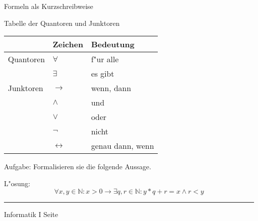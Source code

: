 
\begin{slide}{}
\normalsize
\begin{center}
Formeln als Kurzschreibweise
\end{center}
\vspace{0.5cm}

\footnotesize
\begin{center}
Tabelle der Quantoren und Junktoren

\begin{tabular}[c]{|l|l|l|}
\hline
            & Zeichen    &  Bedeutung  \\
\hline
\cline{2-3}  Quantoren   & $\forall$ & f"ur alle \\
\cline{2-3}              & $\exists$ & es  gibt \\
\hline
\cline{2-3} Junktoren    & $\rightarrow$ & wenn, dann \\
\cline{2-3}              & $\wedge$  & und \\
\cline{2-3}              & $\vee$    & oder \\
\cline{2-3}              & $\neg$    & nicht \\
\cline{2-3}              & $\leftrightarrow$    & genau dann, wenn \\
\hline
\end{tabular}
  
\end{center}
\vspace{1.0cm}

Aufgabe: Formalisieren sie die folgende Aussage.
\begin{center}
\end{center}
\vspace{1.0cm}

L"osung: 
$$ \forall x, y \in \mathbb{N}: x > 0 \rightarrow \exists q, r \in \mathbb{N}: 
   y * q + r = x \wedge r < y $$

\vspace*{\fill}
\tiny \addtocounter{mypage}{1}
\rule{15cm}{1mm}
Informatik I  \hspace*{\fill} Seite 
\end{slide}

